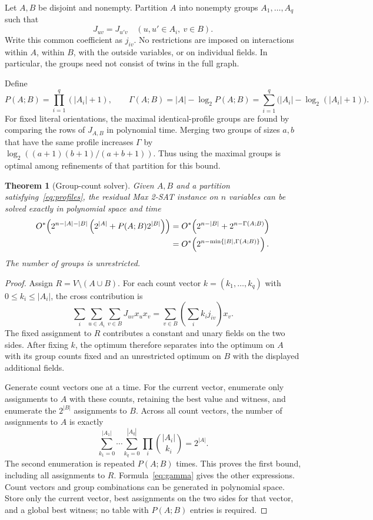 \documentclass[11pt,a4paper]{article}
\newtheorem{theorem}{Theorem}
\theoremstyle{definition}
\newcommand{\Ostar}{O^{*}}
\begin{document}
Let $A,B$ be disjoint and nonempty. Partition $A$ into nonempty groups
$A_1,\ldots,A_q$ such that
\begin{equation}
 J_{uv}=J_{u'v}\quad
 (u,u'\in A_i,\ v\in B). \label{eq:profiles}
\end{equation}
Write this common coefficient as $j_{iv}$. No restrictions are imposed
on interactions within $A$, within $B$, with the outside variables,
or on individual fields. In particular, the groups need not consist of
twins in the full graph.

Define
\begin{equation}
 P(A;B)=\prod_{i=1}^q(|A_i|+1),\qquad
 \Gamma(A;B)=|A|-\log_2 P(A;B)
 =\sum_{i=1}^q\bigl(|A_i|-\log_2(|A_i|+1)\bigr).
 \label{eq:gamma}
\end{equation}
For fixed literal orientations, the maximal identical-profile groups are
found by comparing the rows of $J_{A,B}$ in polynomial time. Merging two
groups of sizes $a,b$ that have the same profile increases $\Gamma$ by
$\log_2((a+1)(b+1)/(a+b+1))$. Thus using the maximal groups is optimal
among refinements of that partition for this bound.

\begin{theorem}[Group-count solver]\label{thm:groups}
Given $A,B$ and a partition satisfying~\eqref{eq:profiles}, the residual
Max 2-SAT instance on $n$ variables can be solved exactly in polynomial
space and time
\begin{align}
 \Ostar\!\left(2^{n-|A|-|B|}
       \left(2^{|A|}+P(A;B)2^{|B|}\right)\right)
 &=\Ostar\!\left(2^{n-|B|}+2^{n-\Gamma(A;B)}\right)\notag\\
 &=\Ostar\!\left(2^{n-\min\{|B|,\Gamma(A;B)\}}\right).
 \label{eq:group-time}
\end{align}
The number of groups is unrestricted.
\end{theorem}
\begin{proof}
Assign $R=V\setminus(A\cup B)$. For each count vector
$k=(k_1,\ldots,k_q)$ with $0\le k_i\le |A_i|$, the cross contribution is
\[
 \sum_i\sum_{u\in A_i}\sum_{v\in B}J_{uv}x_ux_v
 =\sum_{v\in B}\left(\sum_i k_i j_{iv}\right)x_v.
\]
The fixed assignment to $R$ contributes a constant and unary fields on
the two sides. After fixing $k$, the optimum therefore separates into
the optimum on $A$ with its group counts fixed and an unrestricted
optimum on $B$ with the displayed additional fields.

Generate count vectors one at a time. For the current vector, enumerate
only assignments to $A$ with these counts, retaining the best value and
witness, and enumerate the $2^{|B|}$ assignments to $B$. Across all count
vectors, the number of assignments to $A$ is exactly
\[
 \sum_{k_1=0}^{|A_1|}\cdots\sum_{k_q=0}^{|A_q|}
       \prod_i\binom{|A_i|}{k_i}=2^{|A|}.
\]
The second enumeration is repeated $P(A;B)$ times. This proves the first
bound, including all assignments to $R$. Formula~\eqref{eq:gamma}
gives the other expressions. Count vectors and group combinations can
be generated in polynomial space. Store only the current vector, best
assignments on the two sides for that vector, and a global best witness;
no table with $P(A;B)$ entries is required.
\end{proof}
\end{document}
